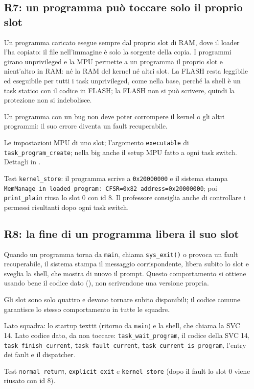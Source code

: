 \subsection{R7: un programma può toccare solo il proprio slot}
\begin{description}\sloppy
    \item[Che cosa chiede] Un programma caricato esegue sempre dal proprio slot di RAM, dove il loader l'ha copiato: il file nell'immagine è solo la sorgente della copia. I programmi girano unprivileged e la MPU permette a un programma il proprio slot e nient'altro in RAM: né la RAM del kernel né altri slot. La FLASH resta leggibile ed eseguibile per tutti i task unprivileged, come nella base, perché la shell è un task statico con il codice in FLASH; la FLASH non si può scrivere, quindi la protezione non si indebolisce.
    \item[Perché serve] Un programma con un bug non deve poter corrompere il kernel o gli altri programmi: il suo errore diventa un fault recuperabile.
    \item[Dove si interviene] Le impostazioni MPU di uno slot; l'argomento \texttt{executable} di \texttt{task\_program\_create}; nella big anche il setup MPU fatto a ogni task switch. Dettagli in .
    \item[Come si verifica] Test \texttt{kernel\_store}: il programma scrive a \texttt{0x20000000} e il sistema stampa \texttt{MemManage in loaded program:\ CFSR=0x82 address=0x20000000}; poi \texttt{print\_plain} riusa lo slot 0 con id 8. Il professore consiglia anche di controllare i permessi risultanti dopo ogni task switch.
\end{description}

\subsection{R8: la fine di un programma libera il suo slot}
\begin{description}\sloppy
    \item[Che cosa chiede] Quando un programma torna da \texttt{main}, chiama \texttt{sys\_exit()} o provoca un fault recuperabile, il sistema stampa il messaggio corrispondente, libera subito lo slot e sveglia la shell, che mostra di nuovo il prompt. Questo comportamento si ottiene usando bene il codice dato (), non scrivendone una versione propria.
    \item[Perché serve] Gli slot sono solo quattro e devono tornare subito disponibili; il codice comune garantisce lo stesso comportamento in tutte le squadre.
    \item[Dove si interviene] Lato squadra: lo startup texttt (ritorno da \texttt{main}) e la shell, che chiama la SVC 14. Lato codice dato, da non toccare: \texttt{task\_wait\_program}, il codice della SVC 14, \texttt{task\_finish\_current}, \texttt{task\_fault\_current}, \texttt{task\_current\_is\_program}, l'entry dei fault e il dispatcher.
    \item[Come si verifica] Test \texttt{normal\_return}, \texttt{explicit\_exit} e \texttt{kernel\_store} (dopo il fault lo slot 0 viene riusato con id 8).
\end{description}

